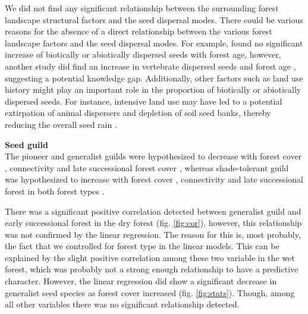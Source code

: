 We did not find any significant relationship between the surrounding forest landscape structural factors and the seed dispersal modes. There could be various reasons for the absence of a direct relationship between the various forest landscape factors and the seed dispersal modes. %
For example, \cite{huancanunezSeedrainsuccessionalFeedbacksWet2021} found no significant increase of biotically or abiotically dispersed seeds with forest age, however, another study did find an increase in vertebrate dispersed seeds and forest age \citep{tabarelli2002abiotic}, suggesting a potential knowledge gap. 
Additionally, other factors such as land use history might play an important role in the proportion of biotically or abiotically dispersed seeds. For instance, intensive land use may have led to a potential extirpation of animal dispersers and depletion of soil seed banks, thereby reducing the overall seed rain  \citep{jakovacRoleLanduseHistory2021}. 




\textbf{Seed guild}\\
The pioneer and generalist guilds were hypothesized to decrease with forest cover \citep{lohbeckSuccessionalChangesFunctional2013, jakovacRoleLanduseHistory2021}, connectivity \citep{dentUnitingNicheDifferentiation2021, hordijkLandUseHistory2024} and late successional forest cover \citep{chazdonDriversBenefitsNatural2025}, whereas shade-tolerant guild was hypothesized to increase with forest cover \citep{hordijkLandUseHistory2024}, connectivity \citep{santo-silvaNatureSeedlingAssemblages2013} and late successional forest in both forest types \citep{huancanunezSeedrainsuccessionalFeedbacksWet2021}.  

There was a significant positive correlation detected between generalist guild and early successional forest in the dry forest (fig. \ref{fig:cor}), however, this relationship was not confirmed by the linear regression. The reason for this is, most probably, the fact that we controlled for forest type in the linear models. This can be explained by the slight positive correlation among these two variable in the wet forest, which was probably not a strong enough relationship to have a predictive character. However, the linear regression did show a significant decrease in generalist seed species as forest cover increased (fig. \ref{fig:stats}). Though, among all other variables there was no significant relationship detected.

